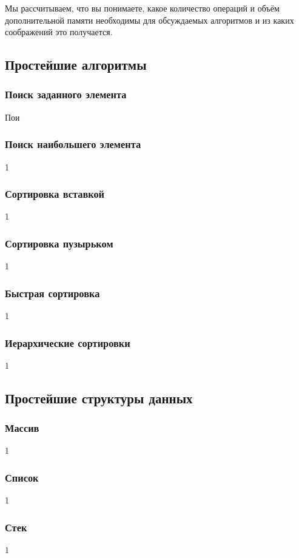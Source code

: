 \documentclass[12pt]{matmex-diploma}
\begin{document}
        Мы рассчитываем, что вы понимаете, какое количество операций и объём дополнительной памяти необходимы для обсуждаемых алгоритмов и из каких соображений это получается.
    
    \subsection{Простейшие алгоритмы}
    
        \subsubsection*{Поиск заданного элемента}
            Пои
        \subsubsection*{Поиск наибольшего элемента}
            1
        \subsubsection*{Сортировка вставкой}
            1
        \subsubsection*{Сортировка пузырьком}
            1
        \subsubsection*{Быстрая сортировка}
            1
        \subsubsection*{Иерархические сортировки}
            1
    \subsection{Простейшие структуры данных}
    
        \subsubsection*{Массив}
            1
        \subsubsection*{Список}
            1
        \subsubsection*{Стек}
            1
\end{document}
